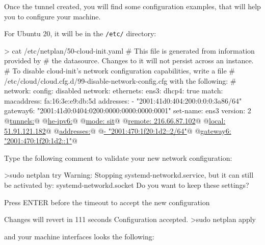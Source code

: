 Once the tunnel created, you will find some configuration examples, that will help you to configure your machine.

For Ubuntu 20, it will be in the \texttt{/etc/} directory:

\begin{termc}[backgroundcolor=\color{palerod}, basicstyle=\ttfamily\tiny, escapechar=@]
> cat /etc/netplan/50-cloud-init.yaml
# This file is generated from information provided by
# the datasource.  Changes to it will not persist across an instance.
# To disable cloud-init's network configuration capabilities, write a file
# /etc/cloud/cloud.cfg.d/99-disable-network-config.cfg with the following:
# network: {config: disabled}
network:
    ethernets:
        ens3:
            dhcp4: true
            match:
                macaddress: fa:16:3e:e9:db:5d
            addresses:
            - "2001:41d0:404:200:0:0:0:3a86/64"
            gateway6: "2001:41d0:0404:0200:0000:0000:0000:0001"
            set-name: ens3
    version: 2
    @\underline{tunnels:}@
      @\underline{he-ipv6:}@
       @\underline{mode: sit}@
       @\underline{remote: 216.66.87.102}@
       @\underline{local: 51.91.121.182}@
       @\underline{addresses:}@
         @\underline{- "2001:470:1f20:1d2::2/64"}@
       @\underline{gateway6: "2001:470:1f20:1d2::1"}@
\end{termc}

\noindent 
Type the following comment to validate your new network configuration:
\begin{termc}[backgroundcolor=\color{palerod}, basicstyle=\ttfamily\tiny, escapechar=@]
>sudo netplan try
Warning: Stopping systemd-networkd.service, but it can still be activated by:
  systemd-networkd.socket
Do you want to keep these settings?


Press ENTER before the timeout to accept the new configuration


Changes will revert in 111 seconds
Configuration accepted.
>sudo netplan apply
\end{termc}
and your machine interfaces looks the following:



